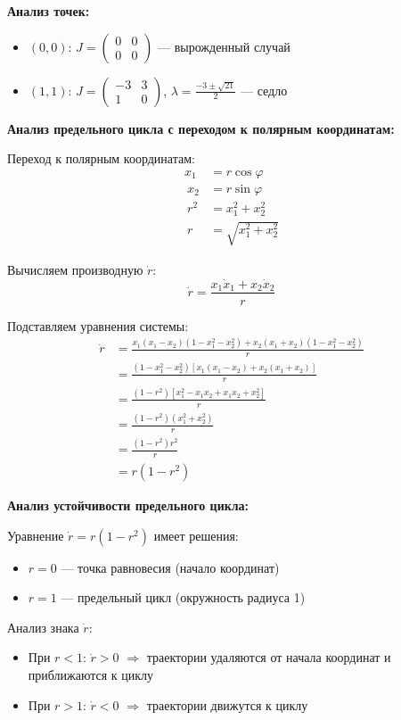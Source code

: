 \textbf{Анализ точек:}
\begin{itemize}
\item $(0, 0)$: $J = \begin{pmatrix} 0 & 0 \\ 0 & 0 \end{pmatrix}$ --- вырожденный случай
\item $(1, 1)$: $J = \begin{pmatrix} -3 & 3 \\ 1 & 0 \end{pmatrix}$, $\lambda = \frac{-3 \pm \sqrt{21}}{2}$ --- седло
\end{itemize}

\textbf{Анализ предельного цикла с переходом к полярным координатам:}

Переход к полярным координатам:
\begin{align}
x_1 &= r\cos\varphi \\\
x_2 &= r\sin\varphi \\\
r^2 &= x_1^2 + x_2^2 \\\
r &= \sqrt{x_1^2 + x_2^2}
\end{align}

Вычисляем производную $\dot{r}$:
$$\dot{r} = \frac{x_1\dot{x}_1 + x_2\dot{x}_2}{r}$$

Подставляем уравнения системы:
\begin{align}
\dot{r} &= \frac{x_1(x_1 - x_2)(1 - x_1^2 - x_2^2) + x_2(x_1 + x_2)(1 - x_1^2 - x_2^2)}{r} \\\
&= \frac{(1 - x_1^2 - x_2^2)[x_1(x_1 - x_2) + x_2(x_1 + x_2)]}{r} \\\
&= \frac{(1 - r^2)[x_1^2 - x_1x_2 + x_1x_2 + x_2^2]}{r} \\\
&= \frac{(1 - r^2)(x_1^2 + x_2^2)}{r} \\\
&= \frac{(1 - r^2)r^2}{r} \\\
&= r(1 - r^2)
\end{align}

\textbf{Анализ устойчивости предельного цикла:}

Уравнение $\dot{r} = r(1 - r^2)$ имеет решения:
\begin{itemize}
\item $r = 0$ --- точка равновесия (начало координат)
\item $r = 1$ --- предельный цикл (окружность радиуса 1)
\end{itemize}

Анализ знака $\dot{r}$:
\begin{itemize}
\item При $r < 1$: $\dot{r} > 0$ $\Rightarrow$ траектории удаляются от начала координат и приближаются к циклу
\item При $r > 1$: $\dot{r} < 0$ $\Rightarrow$ траектории движутся к циклу
\end{itemize}


